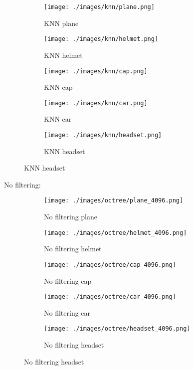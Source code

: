 \begin{figure}[H]
	\centering
	\begin{subfigure}{0.18\textwidth}
		\texttt{[image: ./images/knn/plane.png]}
		\caption{KNN plane}
	\end{subfigure}
	\begin{subfigure}{0.18\textwidth}
		\texttt{[image: ./images/knn/helmet.png]}
		\caption{KNN helmet}
	\end{subfigure}
	\begin{subfigure}{0.18\textwidth}
		\texttt{[image: ./images/knn/cap.png]}
		\caption{KNN cap}
	\end{subfigure}
	\begin{subfigure}{0.18\textwidth}
		\texttt{[image: ./images/knn/car.png]}
		\caption{KNN car}
	\end{subfigure}
	\begin{subfigure}{0.18\textwidth}
		\texttt{[image: ./images/knn/headset.png]}
		\caption{KNN headset}
	\end{subfigure}
\end{figure}

No filtering:

\begin{figure}[H]
	\centering
	\begin{subfigure}{0.18\textwidth}
		\texttt{[image: ./images/octree/plane\_4096.png]}
		\caption{No filtering plane}
	\end{subfigure}
	\begin{subfigure}{0.18\textwidth}
		\texttt{[image: ./images/octree/helmet\_4096.png]}
		\caption{No filtering helmet}
	\end{subfigure}
	\begin{subfigure}{0.18\textwidth}
		\texttt{[image: ./images/octree/cap\_4096.png]}
		\caption{No filtering cap}
	\end{subfigure}
	\begin{subfigure}{0.18\textwidth}
		\texttt{[image: ./images/octree/car\_4096.png]}
		\caption{No filtering car}
	\end{subfigure}
	\begin{subfigure}{0.18\textwidth}
		\texttt{[image: ./images/octree/headset\_4096.png]}
		\caption{No filtering headset}
	\end{subfigure}
\end{figure}



